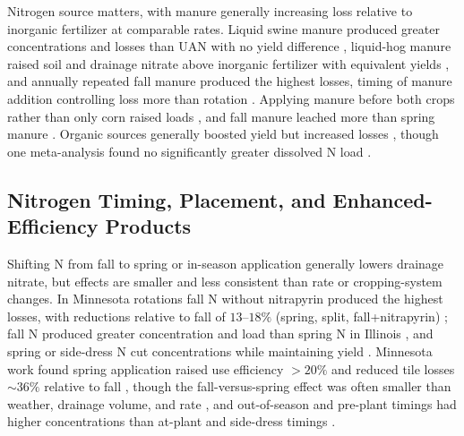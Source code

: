 Nitrogen source matters, with manure generally increasing loss relative to
inorganic fertilizer at comparable rates. Liquid swine manure produced
greater concentrations and losses than UAN with no yield difference
\parencite{Bakhsh2005}, liquid-hog manure raised soil and drainage nitrate
above inorganic fertilizer with equivalent yields \parencite{Elmi2005}, and
annually repeated fall manure produced the highest losses, timing of manure
addition controlling loss more than rotation \parencite{HernandezRamirez2011}.
Applying manure before both crops rather than only corn raised loads
\parencite{Dougherty2020}, and fall manure leached more than spring manure
\parencite{Bakhsh2007,Rekha2011}. Organic sources generally boosted yield but
increased losses \parencite{Liu2021}, though one meta-analysis found no
significantly greater dissolved N load \parencite{Christianson2015b}.

\subsection{Nitrogen Timing, Placement, and Enhanced-Efficiency Products}

Shifting N from fall to spring or in-season application generally lowers
drainage nitrate, but effects are smaller and less consistent than rate or
cropping-system changes. In Minnesota rotations fall N without nitrapyrin
produced the highest losses, with reductions relative to fall of
$13$--$18\%$ (spring, split, fall+nitrapyrin) \parencite{Randall2003,Randall2005};
fall N produced greater concentration and load than spring N in Illinois
\parencite{Gentry2024}, and spring or side-dress N cut concentrations while
maintaining yield \parencite{Pittelkow2017,Vetsch2019}. Minnesota work found
spring application raised use efficiency $>20\%$ and reduced tile losses
$\sim36\%$ relative to fall \parencite{Dinnes2002}, though the fall-versus-spring
effect was often smaller than weather, drainage volume, and rate
\parencite{Liu2021}, and out-of-season and pre-plant timings had higher
concentrations than at-plant and side-dress timings \parencite{Hertzberger2019}.

